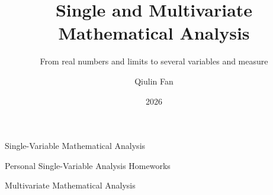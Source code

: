 \documentclass{../toolchain/latex/qlnotes-native}
\title{Single and Multivariate Mathematical Analysis}
\subtitle{From real numbers and limits to several variables and measure}
\author{Qiulin Fan}
\date{2026}
\begin{document}
\frontmatter
\maketitle
\tableofcontents
\mainmatter


\clearpage

Single-Variable Mathematical Analysis

















\clearpage

Personal Single-Variable Analysis Homeworks















\clearpage

Multivariate Mathematical Analysis






\end{document}
